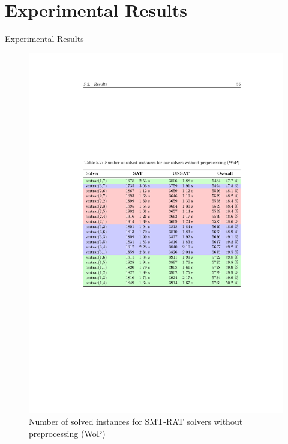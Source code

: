 \documentclass[]{beamer}
\begin{document}
\section{Experimental Results}
\begin{frame}{Experimental Results}
\begin{figure}
    \caption{Number of solved instances for SMT-RAT solvers without preprocessing (WoP)}
    \centering
    \includegraphics[scale=0.7]{../figures/OurSolver.pdf}
\end{figure}
\end{frame}
\end{document}
